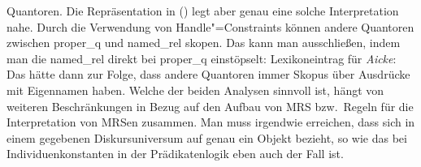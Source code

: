 Quantoren. Die Repräsentation in () legt aber genau eine solche Interpretation nahe. Durch
die Verwendung von Handle"=Constraints können andere Quantoren zwischen proper\_q und named\_rel
skopen. Das kann man ausschließen, indem man die named\_rel direkt bei proper\_q einstöpselt:
\eas
Lexikoneintrag für \emph{Aicke}:\\
\zs
Das hätte dann zur Folge, dass andere Quantoren immer Skopus über Ausdrücke mit Eigennamen
haben. Welche der beiden Analysen sinnvoll ist, hängt von weiteren Beschränkungen in Bezug auf den
Aufbau von MRS bzw.\ Regeln für die Interpretation von MRSen zusammen. Man muss irgendwie erreichen, dass  sich
in einem gegebenen Diskursuniversum auf genau ein Objekt bezieht, so wie das bei
Individuenkonstanten in der Prädikatenlogik eben auch der Fall ist.

